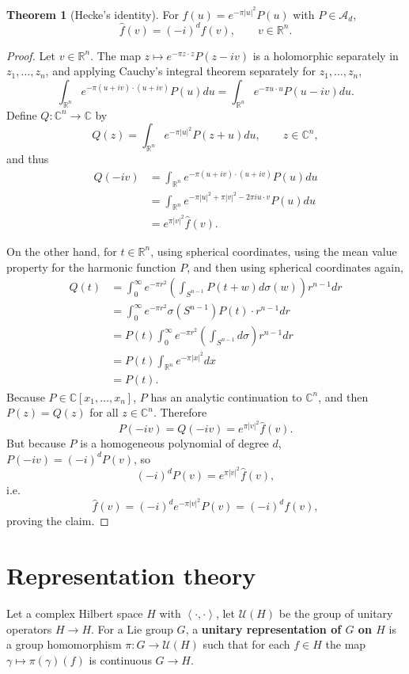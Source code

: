 \documentclass{article}
\newcommand{\inner}[2]{\left\langle #1, #2 \right\rangle}
\theoremstyle{definition}
\newtheorem{theorem}{Theorem}
\theoremstyle{definition}
\begin{document}
\begin{theorem}[Hecke's identity]
For $f(u) = e^{-\pi |u|^2} P(u)$ with $P \in \mathscr{A}_d$,
\[
\widehat{f}(v) = (-i)^{d} f(v),\qquad v \in \mathbb{R}^n.
\]
\end{theorem}
\begin{proof}
Let $v \in \mathbb{R}^n$. The map
$z \mapsto e^{-\pi z \cdot z} P(z-iv)$ is a holomorphic separately in $z_1,\ldots,z_n$, and applying Cauchy's integral theorem separately
for $z_1,\ldots,z_n$,
\[
\int_{\mathbb{R}^n} e^{-\pi(u+iv)\cdot (u+iv)} P(u) du 
=\int_{\mathbb{R}^n} e^{-\pi u\cdot u} P(u-iv) du.
\]
Define $Q:\mathbb{C}^n \to \mathbb{C}$ by 
\[
Q(z) = \int_{\mathbb{R}^n} e^{-\pi |u|^2} P(z+u) du,\qquad z \in \mathbb{C}^n,
\]
and thus
\begin{align*}
Q(-iv)& = \int_{\mathbb{R}^n} e^{-\pi (u+iv)\cdot(u+iv)} P(u) du\\
&=\int_{\mathbb{R}^n} e^{-\pi |u|^2 + \pi|v|^2 - 2\pi i u\cdot v} P(u) du\\
&=e^{\pi |v|^2} \widehat{f}(v).
\end{align*}

On the other hand, for $t \in \mathbb{R}^n$, using spherical coordinates, using the mean value property for the harmonic function $P$,
and then using spherical coordinates again,
\begin{align*}
Q(t)&=\int_0^\infty e^{-\pi r^2} \left( \int_{S^{n-1}} P(t+w) d\sigma(w) \right) r^{n-1} dr\\
&=\int_0^\infty e^{-\pi r^2} \sigma(S^{n-1}) P(t) \cdot r^{n-1} dr\\
&=P(t) \int_0^\infty e^{-\pi r^2}  \left( \int_{S^{n-1}} d\sigma \right) r^{n-1} dr\\
&=P(t) \int_{\mathbb{R}^n} e^{-\pi |x|^2} dx\\
&=P(t).
\end{align*}
Because $P \in \mathbb{C}[x_1,\ldots,x_n]$, $P$ has an analytic continuation to $\mathbb{C}^n$, and then
$P(z) = Q(z)$ for all $z \in \mathbb{C}^n$. 
Therefore
\[
P(-iv) = Q(-iv) = e^{\pi |v|^2} \widehat{f}(v).
\]
But because $P$ is a homogeneous polynomial of degree $d$, $P(-iv) = (-i)^d P(v)$, so
\[
(-i)^d P(v) =  e^{\pi |v|^2} \widehat{f}(v),
\]
i.e.
\[
\widehat{f}(v) = (-i)^d e^{-\pi |v|^2} P(v) = (-i)^d f(v),
\]
proving the claim.
\end{proof}


\section{Representation theory}
Let a complex Hilbert space $H$ with $\inner{\cdot}{\cdot}$, let $\mathscr{U}(H)$ be the group of
unitary operators $H \to H$. 
For a Lie group $G$, 
a \textbf{unitary representation of $G$ on $H$} is a 
group homomorphism $\pi:G \to \mathscr{U}(H)$ such that for each $f \in H$ the map
$\gamma \mapsto \pi(\gamma)(f)$ is continuous $G \to H$. 
\end{document}
